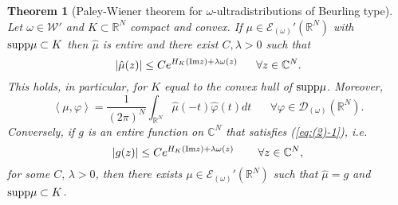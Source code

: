 \documentclass[twoside]{amsart}
\newtheorem{Th}{Theorem}[section]
\begin{document}
\begin{Th}[Paley-Wiener theorem for $\omega$-ultradistributions of
    Beurling type]
  \label{thm:prop 7.2-7.3}
  Let $\omega\in{\mathcal{W}}'$ and $K\subset{\mathbb R}^N$ compact and convex. If
  $\mu\in{\mathcal{E}}_{(\omega)}'({\mathbb R}^N)$
with ${\mathop{\rm supp}\nolimits} \mu\subset K$ then $\hat{\mu}$ is entire and there
exist $C,\lambda>0$ such that
\begin{equation}
  \left|\hat{\mu}(z)\right|\leq Ce^{H_{K}({\mathop{\rm Im}\nolimits} z)+\lambda\omega(z)}
  \,\,\,\,\,\,\,\,\,\,\forall z\in\mathbb{C}^{N}.
  \label{eq:(2)-1}
\end{equation}
This holds, in particular, for $K$ equal to the convex hull of ${\mathop{\rm supp}\nolimits}\mu$.
Moreover,
\begin{equation}
  \left\langle \mu,\varphi\right\rangle =\frac{1}{(2\pi)^{N}}\int_{{\mathbb R}^N}
  \hat{\mu}(-t)\hat{\varphi}(t)dt
  \,\,\,\,\,\,\,\,\,\,\forall\varphi\in{\mathcal{D}}_{(\omega)}({\mathbb R}^N).
  \label{eq:(3)-1}
\end{equation}
Conversely, if $g$ is an entire function on $\mathbb{C}^{N}$ that
satisfies (\ref{eq:(2)-1}), i.e.
\[
|g(z)|\leq Ce^{H_{K}({\mathop{\rm Im}\nolimits} z)+\lambda\omega(z)}
\,\,\,\,\,\,\,\,\,\,\,\,\,\forall z\in\mathbb{C}^{N},
\]
for some $C,\,\lambda>0$, then there exists $\mu\in{\mathcal{E}}_{(\omega)}'({\mathbb R}^N)$ such
that $\hat{\mu}=g$ and ${\mathop{\rm supp}\nolimits}\mu\subset K$.
\end{Th}
\end{document}
